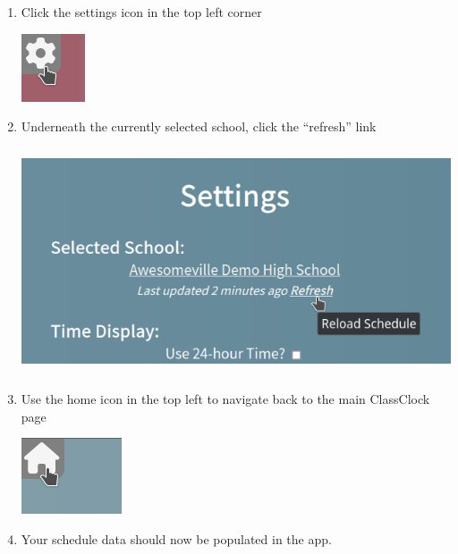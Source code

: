 \documentclass{article}
\begin{document}
\begin{enumerate}
\begin{center}
\end{center}
\item {Click the settings icon in the top left corner}
\begin{center}
\includegraphics[width=0.7398in,height=0.7917in]{Mini20Manual-img014.png}
\end{center}
\item {Underneath the currently selected school, click the “refresh” link }
\begin{center}
\includegraphics[width=5.511in,height=2.6335in]{Mini20Manual-img015.png}
\end{center}
\item {Use the home icon in the top left to navigate back to the main ClassClock page}
\begin{center}
\includegraphics[width=1.1661in,height=0.8846in]{Mini20Manual-img016.png}
\end{center}
\item {Your schedule data should now be populated in the app.}
\begin{center}

\end{center}
\end{enumerate}
\end{document}
